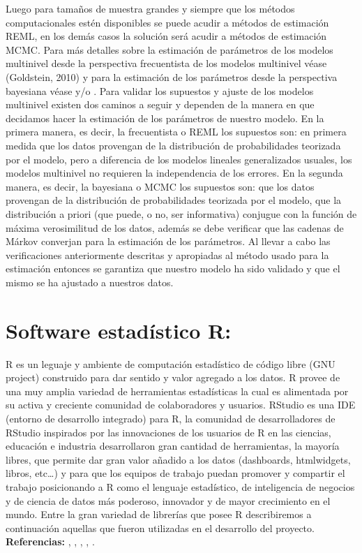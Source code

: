 \documentclass[]{book}
\theoremstyle{definition}
\theoremstyle{definition}
\theoremstyle{definition}
\theoremstyle{remark}
\begin{document}
Luego para tamaños de muestra grandes y siempre que los métodos
computacionales estén disponibles se puede acudir a métodos de
estimación REML, en los demás casos la solución será acudir a métodos de
estimación MCMC. Para más detalles sobre la estimación de parámetros de
los modelos multinivel desde la perspectiva frecuentista de los modelos
multinivel véase (Goldstein, 2010) y para la estimación de los
parámetros desde la perspectiva bayesiana véase \citep{Goldstein} y/o
\citep{HadfieldBook}. Para validar los supuestos y ajuste de los modelos
multinivel existen dos caminos a seguir y dependen de la manera en que
decidamos hacer la estimación de los parámetros de nuestro modelo. En la
primera manera, es decir, la frecuentista o REML los supuestos son: en
primera medida que los datos provengan de la distribución de
probabilidades teorizada por el modelo, pero a diferencia de los modelos
lineales generalizados usuales, los modelos multinivel no requieren la
independencia de los errores. En la segunda manera, es decir, la
bayesiana o MCMC los supuestos son: que los datos provengan de la
distribución de probabilidades teorizada por el modelo, que la
distribución a priori (que puede, o no, ser informativa) conjugue con la
función de máxima verosimilitud de los datos, además se debe verificar
que las cadenas de Márkov converjan para la estimación de los
parámetros. Al llevar a cabo las verificaciones anteriormente descritas
y apropiadas al método usado para la estimación entonces se garantiza
que nuestro modelo ha sido validado y que el mismo se ha ajustado a
nuestros datos.

\section{Software estadístico R:}\label{software-estadistico-r}

R es un leguaje y ambiente de computación estadístico de código libre
(GNU project) construido para dar sentido y valor agregado a los datos.
R provee de una muy amplia variedad de herramientas estadísticas la cual
es alimentada por su activa y creciente comunidad de colaboradores y
usuarios. RStudio es una IDE (entorno de desarrollo integrado) para R,
la comunidad de desarrolladores de RStudio inspirados por las
innovaciones de los usuarios de R en las ciencias, educación e industria
desarrollaron gran cantidad de herramientas, la mayoría libres, que
permite dar gran valor añadido a los datos (dashboards, htmlwidgets,
libros, etc\ldots{}) y para que los equipos de trabajo puedan promover y
compartir el trabajo posicionando a R como el lenguaje estadístico, de
inteligencia de negocios y de ciencia de datos más poderoso, innovador y
de mayor crecimiento en el mundo. Entre la gran variedad de librerías
que posee R describiremos a continuación aquellas que fueron utilizadas
en el desarrollo del proyecto. \textbf{Referencias:} \citep{r1},
\citep{wikiR}, \citep{wikiRStudio}, \citep{rstudio1}, \citep{rstudio2}.
\end{document}
